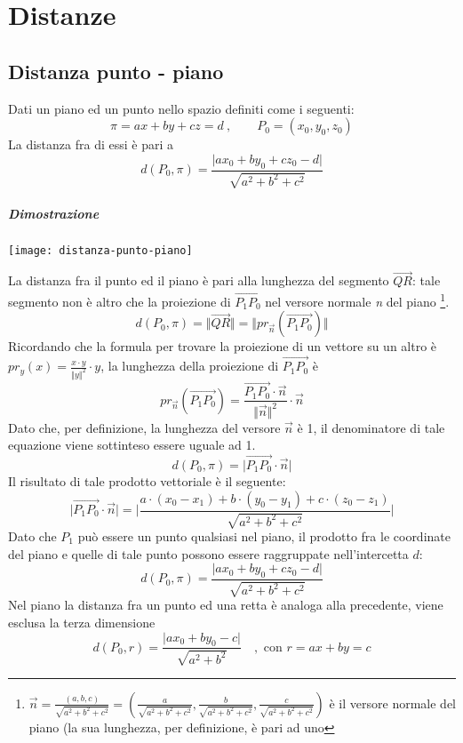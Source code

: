 \chapter{Distanze}
	\section{Distanza punto - piano}
		Dati un piano ed un punto nello spazio definiti come i seguenti:
		$$ \pi = ax + by + cz = d \: , \qquad P_0=(x_0, y_0, z_0) $$
		La distanza fra di essi è pari a
		$$ d(P_0, \pi) = \frac{\vert a x_0 + by_0 + cz_0 - d \vert}{\sqrt{a^2 + b^2 + c^2}} $$
		\begin{GrayBox}
			\paragraph{Dimostrazione}
			\begin{center}
				\texttt{[image: distanza-punto-piano]}
			\end{center}
			La distanza fra il punto ed il piano è pari alla lunghezza del segmento $ \overrightarrow{QR} $: tale segmento non è altro che la proiezione di $ \overrightarrow{P_1P_0} $ nel versore normale \textit{n} del piano \footnote{$ \vec{n} = \frac{(a, b, c)}{\sqrt{a^2 + b^2 + c^2}} = (\frac{a}{\sqrt{a^2 + b^2 + c^2}}, \frac{b}{\sqrt{a^2 + b^2 + c^2}}, \frac{c}{\sqrt{a^2 + b^2 + c^2}})$  è il versore normale del piano (la sua lunghezza, per definizione, è pari ad uno}.
			$$ d (P_0, \pi) = \Vert \overrightarrow{QR} \Vert = \Vert pr_{\vec{n}}(\overrightarrow{P_1P_0}) \Vert $$
			Ricordando che la formula per trovare la proiezione di un vettore su un altro è $ pr_y(x) = \frac{x \cdot y}{\Vert y \Vert^2} \cdot y $, la lunghezza della proiezione di $ \overrightarrow{P_1P_0} $ è
			$$ pr_{\vec{n}}(\overrightarrow{P_1P_0}) = \frac{\overrightarrow{P_1P_0} \cdot \vec{n}}{\Vert \vec{n} \Vert^2} \cdot \vec{n} $$
			Dato che, per definizione, la lunghezza del versore $\vec{n}$ è 1, il denominatore di tale equazione viene sottinteso essere uguale ad 1.
			$$ d(P_0, \pi) = \vert \overrightarrow{P_1P_0} \cdot \vec{n} \vert $$
			Il risultato di tale prodotto vettoriale è il seguente:
			$$ \vert \overrightarrow{P_1P_0} \cdot \vec{n} \vert = \Big\vert \frac{a \cdot (x_0 - x_1) + b \cdot (y_0 - y_1) + c \cdot ( z_0 - z_1 )}{\sqrt{a^2 + b^2 + c^2}} \Big\vert $$
			Dato che $P_1$ può essere un punto qualsiasi nel piano, il prodotto fra le coordinate del piano e quelle di tale punto possono essere raggruppate nell'intercetta $d$:
			$$ d (P_0, \pi) = \frac{\vert a x_0 + b y_0 + c z_0 - d \vert}{\sqrt{a^2 + b^2 + c^2}} $$
			Nel piano la distanza fra un punto ed una retta è analoga alla precedente, viene esclusa la terza dimensione
			$$ d (P_0, r) = \frac{\vert a x_0 + b y_0 - c \vert}{\sqrt{a^2 + b^2}} \quad , \text{ con } r = ax + by = c $$
		\end{GrayBox}

